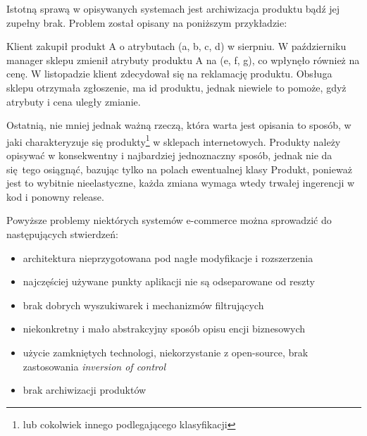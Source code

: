 Istotną sprawą w opisywanych systemach jest archiwizacja produktu bądź jej zupełny brak. Problem został opisany na poniższym przykładzie:
\begin{example}
	Klient zakupił produkt A o atrybutach (a, b, c, d) w sierpniu. W październiku manager sklepu zmienił atrybuty produktu A na (e, f, g), co wpłynęło również na cenę. W listopadzie klient zdecydował się na reklamację produktu. Obsługa sklepu otrzymała zgłoszenie, ma id produktu, jednak niewiele to pomoże, gdyż atrybuty i cena uległy zmianie. 
\end{example}

Ostatnią, nie mniej jednak ważną rzeczą, która warta jest opisania to sposób, w jaki charakteryzuje się produkty\footnote{ lub cokolwiek innego podlegającego klasyfikacji} w sklepach internetowych. Produkty należy opisywać w konsekwentny i najbardziej jednoznaczny sposób, jednak nie da się tego osiągnąć, bazując tylko na polach ewentualnej klasy Produkt, ponieważ jest to wybitnie nieelastyczne, każda zmiana wymaga wtedy trwałej ingerencji w kod i ponowny release.

Powyższe problemy niektórych systemów e-commerce można sprowadzić do następujących stwierdzeń:
\begin{itemize}
	\item architektura nieprzygotowana pod nagłe modyfikacje i rozszerzenia
	\item najczęściej używane punkty aplikacji nie są odseparowane od reszty
	\item brak dobrych wyszukiwarek i mechanizmów filtrujących
	\item niekonkretny i mało abstrakcyjny sposób opisu encji biznesowych
	\item użycie zamkniętych technologi, niekorzystanie z open-source, brak zastosowania \textit{inversion of control}
	\item brak archiwizacji produktów
\end{itemize}

